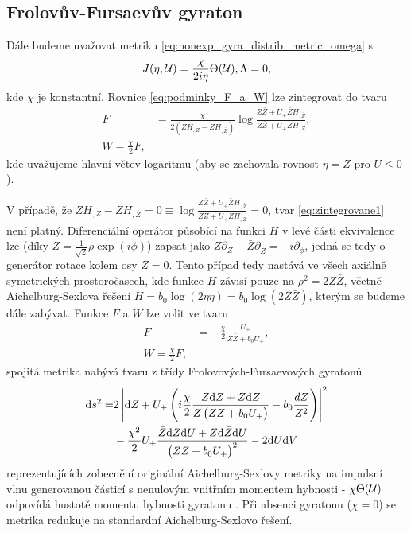 \subsection{Frolovův-Fursaevův gyraton}
Dále budeme uvažovat metriku \eqref{eq:nonexp_gyra_distrib_metric_omega} s
\begin{equation}
    J(\eta , \mathcal{U}) = \frac{\chi}{2 i \eta} \Theta( \mathcal{U} ), \Lambda = 0,
\end{equation}
kde $\chi$ je konstantní. Rovnice \eqref{eq:podminky_F_a_W} lze zintegrovat do tvaru
\begin{equation}
    \label{eq:zintegrovane1}
    \begin{split}
        F &= \frac{\chi}{2(Z H_{,Z}-\bar{Z}H_{,\bar{Z}})} \log \frac{Z\bar{Z}+U_{+}\bar{Z}H_{,\bar{Z}}}{Z\bar{Z}+U_{+}ZH_{,Z}}, \\
        W = \frac{\chi}{2}F,
    \end{split}
\end{equation}
kde uvažujeme hlavní větev logaritmu (aby se zachovala rovnost $\eta = Z$ pro $U \leq 0$).

V případě, že $Z H_{,Z} - \bar{Z}H_{,\bar{Z}}=0 \equiv \log \frac{Z \bar{Z} + U_{+}\bar{Z}H_{,\bar{Z}}}{Z\bar{Z}+U_{+}ZH_{,Z}}=0$,
tvar \eqref{eq:zintegrovane1} není platný. Diferenciální operátor působící na funkci $H$ v levé části ekvivalence
lze (díky $Z = \frac{1}{\sqrt{2}} \rho \exp(i \phi)$) zapsat jako $Z \partial_Z - \bar{Z}\partial_{\bar{Z}} = - i \partial_\phi$,
jedná se tedy o generátor rotace kolem osy $Z = 0$. Tento případ tedy nastává ve všech axiálně symetrických prostoročasech, kde
funkce $H$ závisí pouze na $\rho^2 = 2 Z \bar{Z}$, včetně Aichelburg-Sexlova řešení
$H = b_0 \log(2\eta \bar{\eta}) = b_0 \log (2Z \bar{Z})$, kterým se budeme dále zabývat.
Funkce $F$ a $W$ lze volit ve tvaru
\begin{equation}
    \begin{split}
        F &= -\frac{\chi}{2} \frac{U_{+}}{Z \bar{Z} + b_0 U_{+}}, \\
        W = \frac{\chi}{2}F,
    \end{split}
\end{equation}
spojitá metrika nabývá tvaru z třídy Frolovových-Fursaevových gyratonů \cite{Frolov2005} 
\begin{equation}
    \begin{split}
    \mathrm{d} s^2 = &2 \left| \mathrm{d} Z + U_{+} \left(i \frac{\chi}{2}\frac{\bar{Z}\mathrm{d} Z + Z \mathrm{d} \bar{Z}}{\bar{Z}\left(Z \bar{Z} + b_0 U_{+}\right)} - b_0 \frac{d\bar{Z}}{\bar{Z}^2}\right) \right|^2 \\
    &- \frac{\chi^2}{2}U_{+}\frac{\bar{Z} \mathrm{d} Z \mathrm{d} U + Z \mathrm{d} \bar{Z} \mathrm{d} U}{\left(Z \bar{Z} + b_0 U_{+}\right)^2} - 2 \mathrm{d} U \mathrm{d} V
    \end{split}
\end{equation}
reprezentujících zobecnění
originální Aichelburg-Sexlovy metriky \cite{Aichelburg_1971} na impulsní vlnu generovanou částicí s
nenulovým vnitřním momentem hybnosti - $\chi \Theta(\mathcal{U})$ odpovídá hustotě momentu hybnosti gyratonu \cite{Podolsky2014}.
Při absenci gyratonu ($\chi=0$) se metrika redukuje na standardní Aichelburg-Sexlovo řešení.

